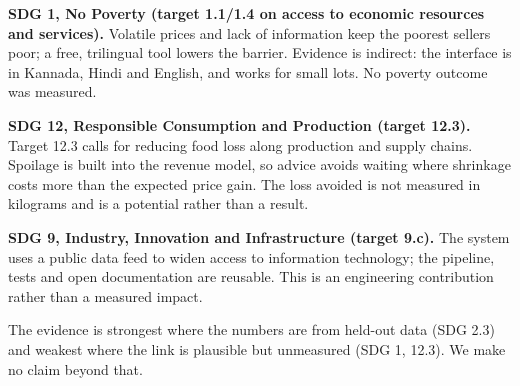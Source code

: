 \noindent\textbf{SDG 1, No Poverty (target 1.1/1.4 on access to economic resources and services).} Volatile prices and lack of information keep the poorest sellers poor; a free, trilingual tool lowers the barrier. Evidence is indirect: the interface is in Kannada, Hindi and English, and works for small lots. No poverty outcome was measured.

\noindent\textbf{SDG 12, Responsible Consumption and Production (target 12.3).} Target 12.3 calls for reducing food loss along production and supply chains. Spoilage is built into the revenue model, so advice avoids waiting where shrinkage costs more than the expected price gain. The loss avoided is not measured in kilograms and is a potential rather than a result.

\noindent\textbf{SDG 9, Industry, Innovation and Infrastructure (target 9.c).} The system uses a public data feed to widen access to information technology; the pipeline, tests and open documentation are reusable. This is an engineering contribution rather than a measured impact.

\vspace{0.3cm}
\noindent The evidence is strongest where the numbers are from held-out data (SDG 2.3) and weakest where the link is plausible but unmeasured (SDG 1, 12.3). We make no claim beyond that.
